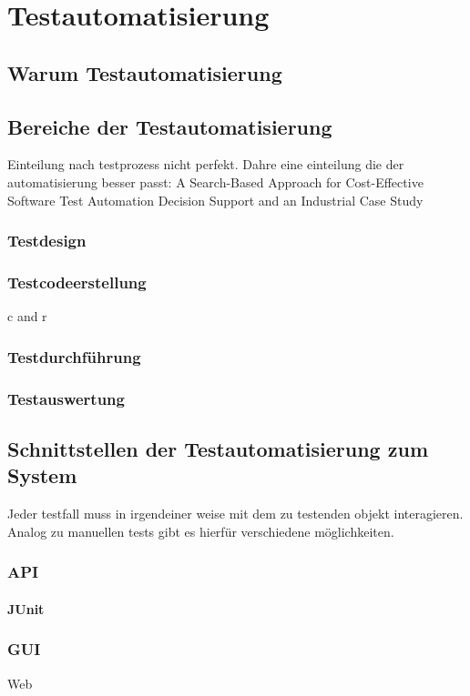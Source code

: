 \chapter{Testautomatisierung}
\label{sec:testautomatisierung}


\section{Warum Testautomatisierung}
\label{sec:warum_testautomatisierung}



\section{Bereiche der Testautomatisierung}
\label{sec:bereiche_der_estautomatisierung}
Einteilung nach testprozess nicht perfekt. Dahre eine einteilung die der automatisierung besser passt:
A Search-Based Approach for Cost-Effective Software Test Automation Decision Support and an Industrial Case Study

\subsection{Testdesign}
\label{subsec:testdesign}


\subsection{Testcodeerstellung}
\label{subsec:testcodeerstellung}
c and r

\subsection{Testdurchführung}
\label{subsec:testdurchführung}


\subsection{Testauswertung}
\label{subsec:testauswertung}



\section{Schnittstellen der Testautomatisierung zum System}
\label{sec:schnittstellen_der_testautomatisierung_zum_syste}

Jeder testfall muss in irgendeiner weise mit dem zu testenden objekt interagieren.
Analog zu manuellen tests gibt es hierfür verschiedene möglichkeiten.
\subsection{API}
\subsubsection{JUnit}
\label{sec:junit}

\subsection{GUI}
Web
